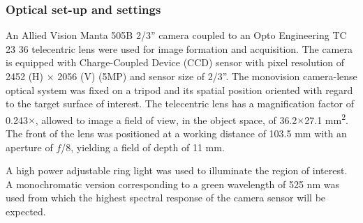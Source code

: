 \documentclass[3p,times,procedia]{elsarticle}
\begin{document}


\subsubsection{Optical set-up and settings}\label{Ss:optical}

An Allied Vision Manta 505B 2/3'' camera coupled to an Opto Engineering TC 23 36 telecentric lens were used for image formation and acquisition. The camera is equipped with Charge-Coupled Device (CCD) sensor with pixel resolution of 2452 (H) $\times$ 2056 (V) (5MP) and sensor size of 2/3''. The monovision camera-lense optical system was fixed on a tripod and its spatial position oriented with regard to the target surface of interest. The telecentric lens has a magnification factor of \num{0.243}$\times$, allowed to image a field of view, in the object space, of 36.2$\times$27.1 \si{\milli\meter\squared}. The front of the lens was positioned at a working distance of 103.5 \si{\milli\meter} with an aperture of $f$/8, yielding a field of depth of 11 \si{\milli\meter}.

A high power adjustable ring light was used to illuminate the region of interest. A monochromatic version corresponding to a green wavelength of \num{525} \si{\nano\meter} was used from which the highest spectral response of the camera sensor will be expected.
\end{document}
